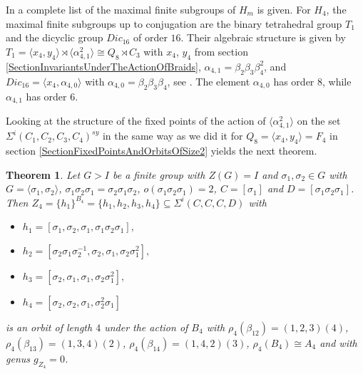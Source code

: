 \documentclass[12pt,a4paper]{article}
\newtheorem{theorem}{Theorem}[section]
\numberwithin{equation}{section}
\numberwithin{table}{section}
\begin{document}
In \cite[Theorem 3]{RefGon2008} a complete list of the maximal finite subgroups of $H_m$ is given.
For $H_4$, the maximal finite subgroups up to conjugation are the binary tetrahedral group $T_1$
and the dicyclic group $Dic_{16}$ of order $16$.
Their algebraic structure is given by 
$T_1 = \langle x_4, y_4 \rangle \rtimes \langle \alpha_{4,1}^2 \rangle \cong Q_8 \rtimes C_3$ 
with $x_4$, $y_4$ from section \ref{SectionInvariantsUnderTheActionOfBraids}, $\alpha_{4,1} = \beta_2 \beta_3 \beta_4^2$,
and $Dic_{16} = \langle x_4, \alpha_{4,0} \rangle$ with $\alpha_{4,0} = \beta_2 \beta_3 \beta_4$,
see \cite[Remark 13]{RefGon2008}. 
The element $\alpha_{4,0}$ has order $8$, while $\alpha_{4,1}$ has order $6$.
\par
\noindent
Looking at the structure of the fixed points of the action of $\langle \alpha_{4,1}^2 \rangle$ on the set $\Sigma^i(C_1,C_2,C_3,C_4)^{sy}$
in the same way as we did it for $Q_8 = \langle x_4, y_4 \rangle = F_4$ in section \ref{SectionFixedPointsAndOrbitsOfSize2}
yields the next theorem.
%
\begin{theorem}
\label{BraidOrbitsOfSize4}
Let $G>I$ be a finite group with $Z(G)=I$ and $\sigma_1, \sigma_2 \in G$ with
$G=\langle \sigma_1, \sigma_2 \rangle$,
$\sigma_1 \sigma_2 \sigma_1 = \sigma_2 \sigma_1 \sigma_2$,
$o(\sigma_1 \sigma_2 \sigma_1 )=2$,
$C=[\sigma_1]$ and $D=[\sigma_1 \sigma_2 \sigma_1]$.
Then $Z_4 = \{ h_1\}^{B_4} = \{ h_1,h_2,h_3,h_4 \} \subseteq \Sigma^i(C,C,C,D)$ with
\begin{itemize}
\item[]
$h_1 = [\sigma_1, \sigma_2, \sigma_1, \sigma_1 \sigma_2 \sigma_1],$
\item[]
$h_2 = [\sigma_2 \sigma_1 \sigma_2^{-1}, \sigma_2, \sigma_1, \sigma_2 \sigma_1^2],$
\item[]
$h_3 = [\sigma_2, \sigma_1, \sigma_1, \sigma_2 \sigma_1^2],$
\item[]
$h_4 = [\sigma_2, \sigma_2, \sigma_1, \sigma_2^2 \sigma_1]$
\end{itemize}
is an orbit of length $4$ under the action of $B_4$ with
$\rho_4(\beta_{12})=(1,2,3)(4)$,
$\rho_4(\beta_{13})=(1,3,4)(2)$,
$\rho_4(\beta_{14})=(1,4,2)(3)$,
$\rho_4(B_4)\cong A_4$
and with genus $g_{Z_4}=0$.
\end{theorem}
\end{document}

